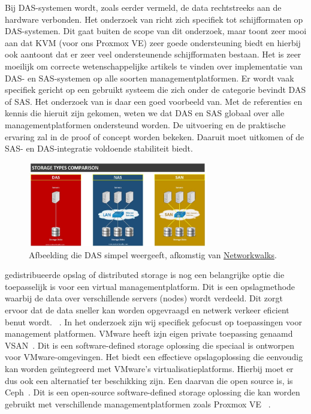 \FloatBarrier
Bij DAS-systemen wordt, zoals eerder vermeld, de data rechtstreeks aan de hardware verbonden. Het onderzoek van \textcite{joshi2014empirical} richt zich specifiek tot schijfformaten op DAS-systemen.
Dit gaat buiten de scope van dit onderzoek, maar toont zeer mooi aan dat KVM (voor ons Proxmox VE) zeer goede ondersteuning biedt en hierbij ook aantoont dat er zeer veel ondersteunende schijfformaten bestaan.
Het is zeer moeilijk om correcte wetenschappelijke artikels te vinden over implementatie van DAS- en SAS-systemen op alle soorten managementplatformen. Er wordt vaak specifiek gericht op een gebruikt systeem die zich onder de categorie bevindt DAS of SAS. Het onderzoek van \textcite{joshi2014empirical} is daar een goed voorbeeld van.
Met de referenties en kennis die hieruit zijn gekomen, weten we dat DAS en SAS globaal over alle managementplatformen ondersteund worden. De uitvoering en de praktische ervaring zal in de proof of concept worden bekeken. Daaruit moet uitkomen of de SAS- en DAS-integratie voldoende stabiliteit biedt.

\begin{figure}[h!]
    \centering
    \includegraphics[width=0.7\textwidth]{../onderzoek/DAS.jpg} 
    \caption{Afbeelding die DAS simpel weergeeft, afkomstig van \href{https://networkwalks.com/storage-types-das-nas-san/I}{Networkwalks}.}
    \label{fig:das}
\end{figure}
\FloatBarrier
gedistribueerde opslag of distributed storage is nog een belangrijke optie die toepasselijk is voor een virtual managementplatform. Dit is een opslagmethode waarbij de data over verschillende servers (nodes) wordt verdeeld. Dit zorgt ervoor dat de data sneller kan worden opgevraagd en netwerk verkeer eficient benut wordt. ~\autocite{patil2010unified}.
In het onderzoek zijn wij specifiek gefocust op toepassingen voor management platformen. VMware heeft izjn eigen private toepassing genaamd VSAN~\autocite{hogan2016essential}. Dit is een software-defined storage oplossing die speciaal is ontworpen voor VMware-omgevingen. Het biedt een effectieve opslagoplossing die eenvoudig kan worden geïntegreerd met VMware's virtualisatieplatforms.
Hierbij moet er dus ook een alternatief ter beschikking zijn. Een daarvan die open source is, is Ceph~\autocite{weil2006ceph}. Dit is een open-source software-defined storage oplossing die kan worden gebruikt met verschillende managementplatformen zoals Proxmox VE ~\autocite{Proxmox}.

